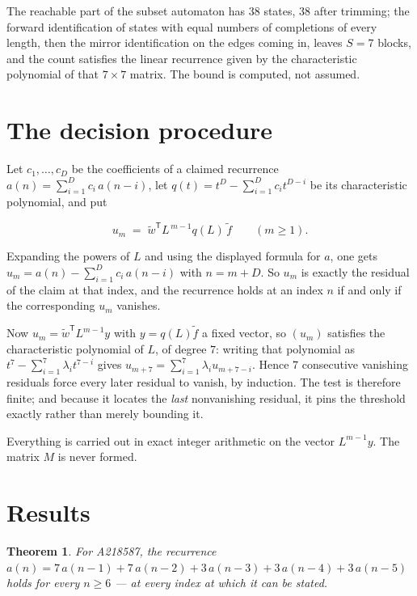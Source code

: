\documentclass[11pt]{article}
\newtheorem{theorem}{Theorem}
\theoremstyle{definition}
\begin{document}
The reachable part of the subset automaton has $38$ states, $38$ after trimming; the forward identification of states with equal numbers of completions of every length, then the mirror identification on the edges coming in, leaves $S = 7$ blocks, and the count satisfies the linear recurrence given by the characteristic polynomial of that $7\times7$ matrix. The bound is computed, not assumed.

\section{The decision procedure}

Let $c_1,\dots,c_D$ be the coefficients of a claimed recurrence $a(n) = \sum_{i=1}^{D} c_i\,a(n-i)$, let $q(t) = t^{D} - \sum_{i=1}^{D} c_i t^{D-i}$ be its characteristic polynomial, and put

\[u_m \;=\; \tilde w^{\mathsf T} L^{\,m-1} q(L)\,\tilde f \qquad (m \ge 1).\]

Expanding the powers of $L$ and using the displayed formula for $a$, one gets $u_m = a(n) - \sum_{i=1}^{D} c_i\,a(n-i)$ with $n = m + D$. So $u_m$ is exactly the residual of the claim at that index, and the recurrence holds at an index $n$ if and only if the corresponding $u_m$ vanishes.

Now $u_m = \tilde w^{\mathsf T} L^{m-1} y$ with $y = q(L)\tilde f$ a fixed vector, so $(u_m)$ satisfies the characteristic polynomial of $L$, of degree $7$: writing that polynomial as $t^{7} - \sum_{i=1}^{7} \lambda_i t^{7-i}$ gives $u_{m+7} = \sum_{i=1}^{7} \lambda_i u_{m+7-i}$. Hence $7$ consecutive vanishing residuals force every later residual to vanish, by induction. The test is therefore finite; and because it locates the {\itshape last} nonvanishing residual, it pins the threshold exactly rather than merely bounding it.

Everything is carried out in exact integer arithmetic on the vector $L^{m-1}y$. The matrix $M$ is never formed.

\section{Results}

\begin{theorem} For A218587, the recurrence $a(n) = 7\,a(n-1) + 7\,a(n-2) + 3\,a(n-3) + 3\,a(n-4) + 3\,a(n-5)$ holds for every $n \ge 6$ --- at every index at which it can be stated.\end{theorem}
\end{document}
